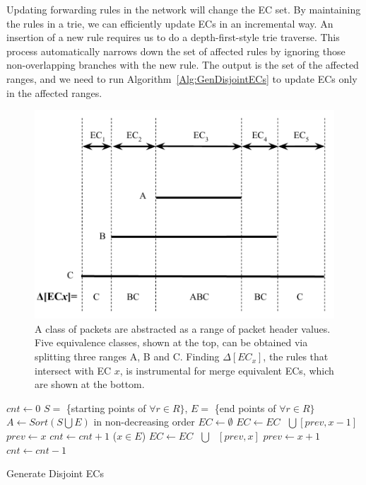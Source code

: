Updating forwarding rules in the network will change the EC set.
By maintaining the rules in a trie, we can efficiently update ECs in an incremental way. An insertion of a new rule requires us to do a depth-first-style trie traverse. This process automatically narrows down the set of affected rules by ignoring those non-overlapping branches with the new rule.
The output is the set of the affected ranges, and we need to run Algorithm~\ref{Alg:GenDisjointECs} to update ECs only in the affected ranges.


\begin{figure}[t]
\centering
\includegraphics[scale=.52]{figures/DisjointECs.pdf}
\caption{A class of packets are abstracted as a range of packet header values.
        Five equivalence classes, shown at the top, can be obtained via splitting three ranges A, B and C.
        Finding $\Delta[EC_x]$, the rules that intersect with EC $x$, is instrumental for
        merge equivalent ECs, which are shown at the bottom.}
\label{Fig:DisjointECsAsInterval}
\end{figure}

\begin{algorithm}[t]
\DontPrintSemicolon
{}
$cnt \gets 0$\;
$S = $ \{starting points of $\forall r \in R\}$, $E = $ \{end points of $\forall r \in R\}$\;
$A \gets Sort(S \bigcup E)$ in non-decreasing order\;
$EC \gets \emptyset$\;
 {
         {
                 {\label{Alg:LineEndStart1} 
                        $EC \gets EC \text{ }\bigcup \text{} [prev, x-1]$\;
                }\label{Alg:LineEndStart2} 
                $prev \gets x$\;\label{Alg:LineNewPrev1}
                $cnt \gets cnt + 1$\;
        }
        \Else ($x \in E$) {
                $EC \gets EC \text{ } \bigcup \text{ } [prev, x]$\;\label{Alg:LineEndEnd}
                $prev \gets x + 1$\;\label{Alg:LineNewPrev2}
                $cnt \gets cnt - 1$\;
        }
}
\caption{Generate Disjoint ECs}
\label{Alg:GenDisjointECs}
\end{algorithm}

